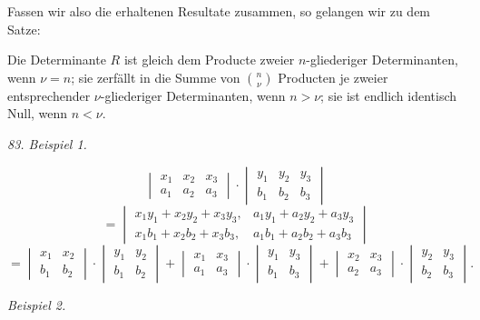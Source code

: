 Fassen wir also die erhaltenen Resultate zusammen, so gelangen wir zu dem Satze:

\glqq Die Determinante $R$ ist gleich dem Producte zweier $n$-gliederiger Determinanten, wenn $\nu=n$; sie zerfällt in die Summe von $\binom{n}{\nu}$ Producten je zweier entsprechender $\nu$-gliederiger Determinanten, wenn $n>\nu$; sie ist endlich identisch Null, wenn $n<\nu$.\grqq{}

\textit{83. Beispiel 1.}

\[
\begin{vmatrix}
x_1 & x_2 & x_3\\
a_1 & a_2 & a_3
\end{vmatrix}
\cdot
\begin{vmatrix}
y_1 & y_2 & y_3\\
b_1 & b_2 & b_3
\end{vmatrix}
\]
\[
=
\begin{vmatrix}
x_1y_1+x_2y_2+x_3y_3, & a_1y_1+a_2y_2+a_3y_3\\
x_1b_1+x_2b_2+x_3b_3, & a_1b_1+a_2b_2+a_3b_3
\end{vmatrix}
\]
\[
=
\begin{vmatrix}x_1 & x_2\\ b_1 & b_2\end{vmatrix}\cdot\begin{vmatrix}y_1 & y_2\\ b_1 & b_2\end{vmatrix}
+\begin{vmatrix}x_1 & x_3\\ a_1 & a_3\end{vmatrix}\cdot\begin{vmatrix}y_1 & y_3\\ b_1 & b_3\end{vmatrix}
+\begin{vmatrix}x_2 & x_3\\ a_2 & a_3\end{vmatrix}\cdot\begin{vmatrix}y_2 & y_3\\ b_2 & b_3\end{vmatrix}.
\]

\textit{Beispiel 2.}

